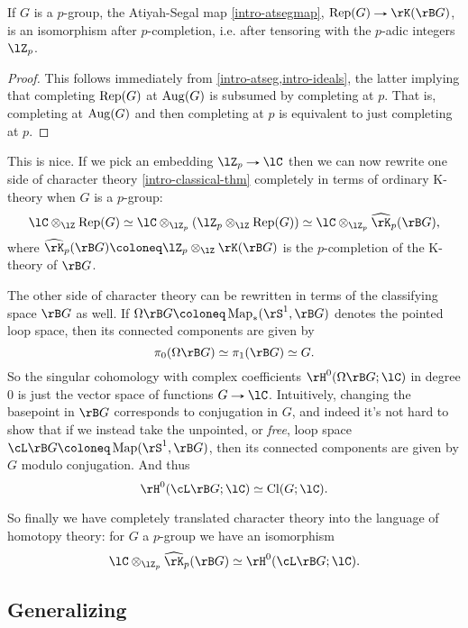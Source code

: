 \begin{lemma}
  \label{intro-completions}
  If $G$ is a $p$-group, the Atiyah-Segal map \cref{intro-atsegmap},
  $\Rep(G) \to \rK(\rB G)$, is an isomorphism after $p$-completion,
  i.e. after tensoring with the $p$-adic integers $\lZ_p$.
\end{lemma}

\begin{proof}
  This follows immediately from \cref{intro-atseg,intro-ideals}, the
  latter implying that completing $\operatorname{Rep}(G)$ at $\operatorname{Aug}(G)$ is subsumed
  by completing at $p$. That is, completing at $\operatorname{Aug}(G)$ and then
  completing at $p$ is equivalent to just completing at $p$.
\end{proof}

This is nice. If we pick an embedding $\lZ_p \to \lC$ then we can now
rewrite one side of character theory \cref{intro-classical-thm}
completely in terms of ordinary K-theory when $G$ is a $p$-group:
\[
\lC \otimes_\lZ \Rep(G) \iso
\lC \otimes_{\lZ_p} (\lZ_p \otimes_\lZ \Rep(G)) \iso
\lC \otimes_{\lZ_p} \hat\rK_p(\rB G),
\]
where $\hat\rK_p(\rB G) \ce \lZ_p \otimes_\lZ \rK(\rB G)$ is the
$p$-completion of the K-theory of $\rB G$.

The other side of character theory can be rewritten in terms of the
classifying space $\rB G$ as well. If
$\Omega\rB G \ce \Map_*(\rS^1,\rB G)$ denotes the pointed loop space,
then its connected components are given by
\[
\pi_0(\Omega\rB G) \iso \pi_1(\rB G) \iso G.
\]
So the singular cohomology with complex coefficients
$\rH^0(\Omega\rB G;\lC)$ in degree $0$ is just the vector space of
functions $G \to \lC$. Intuitively, changing the basepoint in $\rB G$
corresponds to conjugation in $G$, and indeed it's not hard to show
that if we instead take the unpointed, or \emph{free}, loop space
$\cL \rB G \ce \Map(\rS^1,\rB G)$, then its connected components are
given by $G$ modulo conjugation. And thus
\[
\rH^0(\cL\rB G;\lC) \iso \Cl(G;\lC).
\]

So finally we have completely translated character theory into the
language of homotopy theory: for $G$ a $p$-group we have an
isomorphism
\begin{equation}
  \label{intro-translated}
  \lC \otimes_{\lZ_p} \hat\rK_p(\rB G) \iso \rH^0(\cL\rB G; \lC).
\end{equation}


\subsection{Generalizing}
\label{intro-general}

